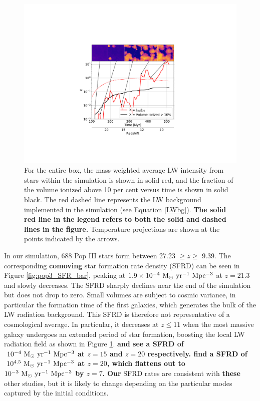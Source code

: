 \documentclass[fleqn,usenatbib]{mnras}
\begin{document}
\begin{figure}
	\includegraphics[width=\columnwidth]{images/jlw_xe_bg_mass_weight.pdf}
    \caption{For the entire box, the mass-weighted average LW intensity from stars within the simulation is shown in solid red, and the fraction of the volume ionized above 10 per cent versus time is shown in solid black. The red dashed line represents the LW background implemented in the simulation (see Equation \ref{LWbg}). \textbf{The solid red line in the legend refers to both the solid and dashed lines in the figure.} Temperature projections are shown at the points indicated by the arrows.}
    \label{fig:JLW_xe_mass}
\end{figure}

In our simulation, 688 Pop III stars form between 27.23 $\geq z \geq$ 9.39. The corresponding \textbf{comoving} star formation rate density (SFRD) can be seen in Figure \ref{fig:pop3_SFR_bar}, peaking at $1.9 \times 10^{-4} \ \rm M_{\odot} \ yr^{-1} \ Mpc^{-3}$ at $z = 21.3$ and slowly decreases. The SFRD sharply declines near the end of the simulation but does not drop to zero. Small volumes are subject to cosmic variance, in particular the formation time of the first galaxies, which generates the bulk of the LW radiation background.  This SFRD is therefore not representative of a cosmological average.  In particular, it decreases at $z \le 11$ when the most massive galaxy undergoes an extended period of star formation, boosting the local LW radiation field as shown in Figure \ref{fig:JLW_xe_mass}. \textbf{\citet{Xu13} and \citet{Magg16} see a SFRD of $~10^{-4}~\rm M_{\odot} \ yr^{-1} \ Mpc^{-3}$ at $z = 15$ and $z = 20$ respectively. \citet{Jaacks19} find a SFRD of $~10^{4.5}~\rm M_{\odot} \ yr^{-1} \ Mpc^{-3}$ at $z = 20$, which flattens out to $10^{-3}~\rm M_{\odot} \ yr^{-1} \ Mpc^{-3}$ by $z =7$.} \textbf{Our} SFRD rates are consistent with \textbf{these} other studies, but it is likely to change depending on the particular modes captured by the initial conditions.
\end{document}
